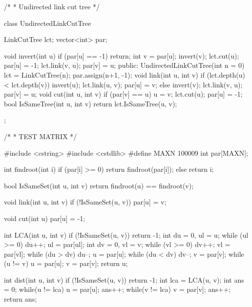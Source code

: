 \documentclass[11pt]{article}
\begin{document}
\begin{vncode}
/*
 * Undirected link cut tree
 */

class UndirectedLinkCutTree {
	LinkCutTree lct;
	vector<int> par;

	void invert(int u) {
		if (par[u] == -1) return;
		int v = par[u];
		invert(v);
		lct.cut(u); par[u] = -1;
		lct.link(v, u); par[v] = u;
	}
public:
	UndirectedLinkCutTree(int n = 0) {
		lct = LinkCutTree(n);
		par.assign(n+1, -1);
	}
	void link(int u, int v) {
		if (lct.depth(u) < lct.depth(v)) {
			invert(u);
			lct.link(u, v); par[u] = v;
		}
		else {
			invert(v);
			lct.link(v, u); par[v] = u;
		}
	}
	void cut(int u, int v) {
		if (par[v] == u) u = v;
		lct.cut(u); par[u] = -1;
	}
	bool IsSameTree(int u, int v) {
		return lct.IsSameTree(u, v);
	}
};

/*
 * TEST MATRIX
 */

#include <cstring>
#include <cstdlib>
#define MAXN 100009
int par[MAXN];

int findroot(int i) {
	if (par[i] >= 0) return findroot(par[i]);
	else return i;
}

bool IsSameSet(int u, int v) {
	return findroot(u) == findroot(v);
}

void link(int u, int v) {
	if (!IsSameSet(u, v)) par[u] = v;
}

void cut(int u) {
	par[u] = -1;
}

int LCA(int u, int v) {
	if (!IsSameSet(u, v)) return -1;
	int du = 0, ul = u;
	while (ul >= 0) {
		du++;
		ul = par[ul];
	}
	int dv = 0, vl = v;
	while (vl >= 0) {
		dv++;
		vl = par[vl];
	}
	while (du > dv) {
		du--;
		u = par[u];
	}
	while (du < dv) {
		dv--;
		v = par[v];
	}
	while (u != v) {
		u = par[u];
		v = par[v];
	}
	return u;
}

int dist(int u, int v) {
	if (!IsSameSet(u, v)) return -1;
	int lca = LCA(u, v);
	int ans = 0;
	while(u != lca) {
		u = par[u];
		ans++;
	}
	while(v != lca) {
		v = par[v];
		ans++;
	}
	return ans;
}


\end{vncode}
\end{document}
